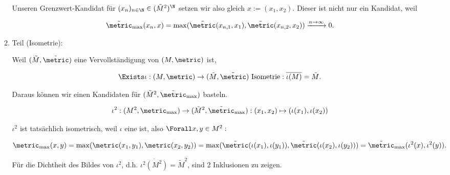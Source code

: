 \begin{solution}
\begin{enumerate}[label = \arabic*.]
\begin{enumerate}[label = 2.\arabic*.]
        Unseren Grenzwert-Kandidat für $(x_n)_{n \in \N} \in (\tilde M^2)^\N$ setzen wir also gleich $x := (x_1, x_2)$.
        Dieser ist nicht nur ein Kandidat, weil

        \begin{align*}
            \tilde \metric_{\max}(x_n, x)
            =
            \max
            (
                \tilde \metric(x_{n, 1}, x_1),
                \tilde \metric(x_{n, 2}, x_2)
            )
            \xrightarrow{n \to \infty}
            0.
        \end{align*}

        \item Teil (Isometrie):
        
        Weil $(\tilde M, \tilde \metric)$ eine Vervollständigung von $(M, \metric)$ ist,

        \begin{align*}
            \Exists \iota:
            (M, \metric) \to (\tilde M, \tilde \metric) ~\text{Isometrie}:
            \overline{\iota(M)} = \tilde M.
        \end{align*}

        Daraus können wir einen Kandidaten für $(\tilde M^2, \tilde \metric_{\max})$ basteln.

        \begin{align*}
            \iota^2:
            (M^2, \metric_{\max})
            \to
            (\tilde M^2, \tilde \metric_{\max}):
            (x_1, x_2)
            \mapsto
            (
                \iota(x_1),
                \iota(x_2)
            )
        \end{align*}

        $\iota^2$ ist tatsächlich isometrisch, weil $\iota$ eine ist, also $\Forall x, y \in M^2:$

        \begin{align*}
            \metric_{\max}(x, y)
            =
            \max
            (
                \metric(x_1, y_1),
                \metric(x_2, y_2)
            )
            =
            \max
            (
                \tilde \metric(\iota(x_1), \iota(y_1)),
                \tilde \metric(\iota(x_2), \iota(y_2))
            )
            =
            \tilde \metric_{\max}(\iota^2(x), \iota^2(y)).
        \end{align*}

        Für die Dichtheit des Bildes von $\iota^2$, d.h. $\overline{\iota^2(M^2)} = \tilde M^2$, sind 2 Inklusionen zu zeigen.


\end{enumerate}
\end{enumerate}
\end{solution}
